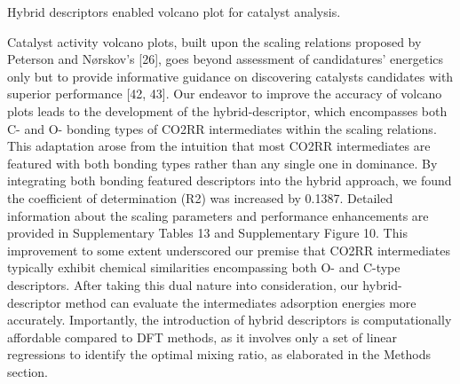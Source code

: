 Hybrid descriptors enabled volcano plot for catalyst analysis.

Catalyst activity volcano plots, built upon the scaling relations proposed by Peterson and Nørskov's [26], goes beyond assessment of candidatures' energetics only but to provide informative guidance on discovering catalysts candidates with superior performance [42, 43]. Our endeavor to improve the accuracy of volcano plots leads to the development of the hybrid-descriptor, which encompasses both C- and O- bonding types of CO2RR intermediates within the scaling relations. This adaptation arose from the intuition that most CO2RR intermediates are featured with both bonding types rather than any single one in dominance. By integrating both bonding featured descriptors into the hybrid approach, we found the coefficient of determination (R2) was increased by 0.1387. Detailed information about the scaling parameters and performance enhancements are provided in Supplementary Tables 13 and Supplementary Figure 10. This improvement to some extent underscored our premise that CO2RR intermediates typically exhibit chemical similarities encompassing both O- and C-type descriptors. After taking this dual nature into consideration, our hybrid-descriptor method can evaluate the intermediates adsorption energies more accurately. Importantly, the introduction of hybrid descriptors is computationally affordable compared to DFT methods, as it involves only a set of linear regressions to identify the optimal mixing ratio, as elaborated in the Methods section.

